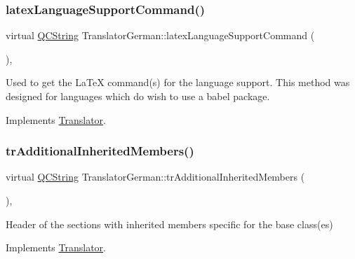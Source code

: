 \mbox{\label{class_translator_german_a108ba85b60e425c275b9e9bc18b81116}} 
\subsubsection{\texorpdfstring{latexLanguageSupportCommand()}{latexLanguageSupportCommand()}}
{\footnotesize\ttfamily virtual \mbox{\hyperlink{class_q_c_string}{Q\+C\+String}} Translator\+German\+::latex\+Language\+Support\+Command (\begin{DoxyParamCaption}{ }\end{DoxyParamCaption})\hspace{0.3cm}{\ttfamily [inline]}, {\ttfamily [virtual]}}

Used to get the La\+TeX command(s) for the language support. This method was designed for languages which do wish to use a babel package. 

Implements \mbox{\hyperlink{class_translator}{Translator}}.

\mbox{\label{class_translator_german_a289ea8b81cae78f0584ddf5a716522ec}} 
\subsubsection{\texorpdfstring{trAdditionalInheritedMembers()}{trAdditionalInheritedMembers()}}
{\footnotesize\ttfamily virtual \mbox{\hyperlink{class_q_c_string}{Q\+C\+String}} Translator\+German\+::tr\+Additional\+Inherited\+Members (\begin{DoxyParamCaption}{ }\end{DoxyParamCaption})\hspace{0.3cm}{\ttfamily [inline]}, {\ttfamily [virtual]}}

Header of the sections with inherited members specific for the base class(es) 

Implements \mbox{\hyperlink{class_translator}{Translator}}.

\mbox{\label{class_translator_german_a07f724186792847161c461e646ececfb}} 
